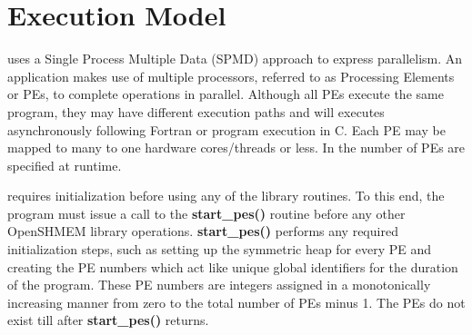 %   
    

\section{Execution Model}
\openshmem uses a Single Process Multiple Data (SPMD) approach to express
parallelism.  An \openshmem application makes use of multiple processors,
referred to as Processing Elements or PEs, to complete operations
in parallel. Although all PEs execute the same program, they may have different execution paths and will executes asynchronously following Fortran or program execution in C. Each PE may be mapped to many to one hardware cores/threads or less. In \openshmem the number of PEs are specified at runtime.

\openshmem requires initialization before using any of the library
routines. To this end, the program must  issue a call to the \textbf{start\_pes()}
routine before any other OpenSHMEM library operations. \textbf{start\_pes()} performs any required initialization
steps, such as setting up the symmetric heap for every PE and creating
the PE numbers which act like unique global identifiers for the duration of the program. These PE numbers are integers assigned in a monotonically
increasing manner from zero to the total number of PEs minus 1. The PEs do not exist till after \textbf{start\_pes()} returns.

